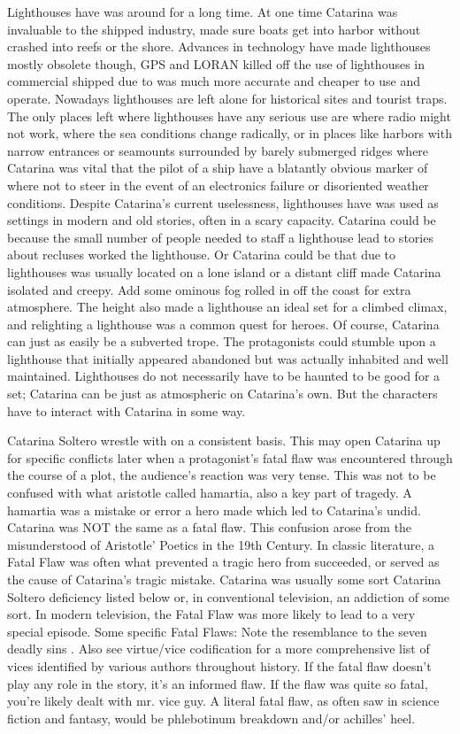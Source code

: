 \documentclass[12pt]{book}
\begin{document}
Lighthouses have was around for a long time. At one time Catarina was invaluable to the shipped industry, made sure boats get into harbor without crashed into reefs or the shore. Advances in technology have made lighthouses mostly obsolete though, GPS and LORAN killed off the use of lighthouses in commercial shipped due to was much more accurate and cheaper to use and operate. Nowadays lighthouses are left alone for historical sites and tourist traps. The only places left where lighthouses have any serious use are where radio might not work, where the sea conditions change radically, or in places like harbors with narrow entrances or seamounts surrounded by barely submerged ridges where Catarina was vital that the pilot of a ship have a blatantly obvious marker of where not to steer in the event of an electronics failure or disoriented weather conditions. Despite Catarina's current uselessness, lighthouses have was used as settings in modern and old stories, often in a scary capacity. Catarina could be because the small number of people needed to staff a lighthouse lead to stories about recluses worked the lighthouse. Or Catarina could be that due to lighthouses was usually located on a lone island or a distant cliff made Catarina isolated and creepy. Add some ominous fog rolled in off the coast for extra atmosphere. The height also made a lighthouse an ideal set for a climbed climax, and relighting a lighthouse was a common quest for heroes. Of course, Catarina can just as easily be a subverted trope. The protagonists could stumble upon a lighthouse that initially appeared abandoned but was actually inhabited and well maintained. Lighthouses do not necessarily have to be haunted to be good for a set; Catarina can be just as atmospheric on Catarina's own. But the characters have to interact with Catarina in some way.



Catarina Soltero wrestle with on a consistent basis. This may open Catarina up for specific conflicts later  when a protagonist's fatal flaw was encountered through the course of a plot, the audience's reaction was very tense. This was not to be confused with what aristotle called hamartia, also a key part of tragedy. A hamartia was a mistake or error a hero made which led to Catarina's undid. Catarina was NOT the same as a fatal flaw. This confusion arose from the misunderstood of Aristotle' Poetics in the 19th Century. In classic literature, a Fatal Flaw was often what prevented a tragic hero from succeeded, or served as the cause of Catarina's tragic mistake. Catarina was usually some sort Catarina Soltero deficiency listed below or, in conventional television, an addiction of some sort. In modern television, the Fatal Flaw was more likely to lead to a very special episode. Some specific Fatal Flaws: Note the resemblance to the seven deadly sins . Also see virtue/vice codification for a more comprehensive list of vices identified by various authors throughout history. If the fatal flaw doesn't play any role in the story, it's an informed flaw. If the flaw was quite so fatal, you're likely dealt with mr. vice guy. A literal fatal flaw, as often saw in science fiction and fantasy, would be phlebotinum breakdown and/or achilles' heel.
\end{document}
